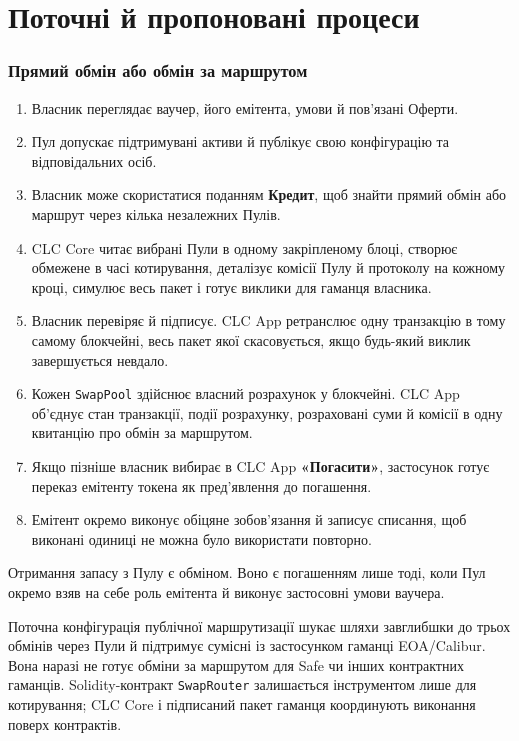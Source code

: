 \documentclass[11pt]{article}
\begin{document}
\section*{Поточні й пропоновані процеси}

\subsubsection*{Прямий обмін або обмін за маршрутом}

\begin{enumerate}[leftmargin=*]
\item Власник переглядає ваучер, його емітента, умови й пов'язані Оферти.
\item Пул допускає підтримувані активи й публікує свою конфігурацію та відповідальних осіб.
\item Власник може скористатися поданням \textbf{Кредит}, щоб знайти прямий обмін або маршрут через кілька незалежних Пулів.
\item CLC Core читає вибрані Пули в одному закріпленому блоці, створює обмежене в часі котирування, деталізує комісії Пулу й протоколу на кожному кроці, симулює весь пакет і готує виклики для гаманця власника.
\item Власник перевіряє й підписує. CLC App ретранслює одну транзакцію в тому самому блокчейні, весь пакет якої скасовується, якщо будь-який виклик завершується невдало.
\item Кожен \texttt{SwapPool} здійснює власний розрахунок у блокчейні. CLC App об'єднує стан транзакції, події розрахунку, розраховані суми й комісії в одну квитанцію про обмін за маршрутом.
\item Якщо пізніше власник вибирає в CLC App \textbf{«Погасити»}, застосунок готує переказ емітенту токена як пред'явлення до погашення.
\item Емітент окремо виконує обіцяне зобов'язання й записує списання, щоб виконані одиниці не можна було використати повторно.
\end{enumerate}
Отримання запасу з Пулу є обміном. Воно є погашенням лише тоді, коли Пул окремо взяв на себе роль емітента й виконує застосовні умови ваучера.

Поточна конфігурація публічної маршрутизації шукає шляхи завглибшки до трьох обмінів через Пули й підтримує сумісні із застосунком гаманці EOA/Calibur. Вона наразі не готує обміни за маршрутом для Safe чи інших контрактних гаманців. Solidity-контракт \texttt{SwapRouter} залишається інструментом лише для котирування; CLC Core і підписаний пакет гаманця координують виконання поверх контрактів.
\end{document}
